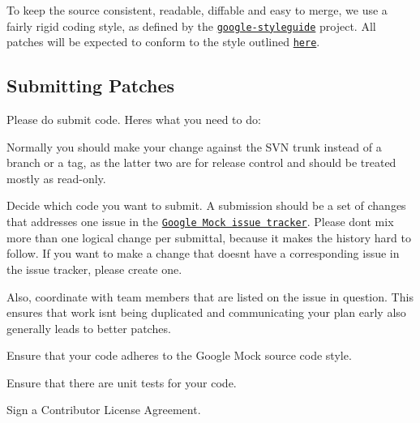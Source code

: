To keep the source consistent, readable, diffable and easy to merge, we use a fairly rigid coding style, as defined by the \href{https://github.com/google/styleguide}{\tt google-\/styleguide} project. All patches will be expected to conform to the style outlined \href{https://github.com/google/styleguide/blob/gh-pages/cppguide.xml}{\tt here}.

\subsection*{Submitting Patches}

Please do submit code. Here\textquotesingle{}s what you need to do\+:


\begin{DoxyEnumerate}
\item Normally you should make your change against the S\+VN trunk instead of a branch or a tag, as the latter two are for release control and should be treated mostly as read-\/only.
\end{DoxyEnumerate}
\begin{DoxyEnumerate}
\item Decide which code you want to submit. A submission should be a set of changes that addresses one issue in the \href{http://code.google.com/p/googlemock/issues/list}{\tt Google Mock issue tracker}. Please don\textquotesingle{}t mix more than one logical change per submittal, because it makes the history hard to follow. If you want to make a change that doesn\textquotesingle{}t have a corresponding issue in the issue tracker, please create one.
\end{DoxyEnumerate}
\begin{DoxyEnumerate}
\item Also, coordinate with team members that are listed on the issue in question. This ensures that work isn\textquotesingle{}t being duplicated and communicating your plan early also generally leads to better patches.
\end{DoxyEnumerate}
\begin{DoxyEnumerate}
\item Ensure that your code adheres to the Google Mock source code style.
\end{DoxyEnumerate}
\begin{DoxyEnumerate}
\item Ensure that there are unit tests for your code.
\end{DoxyEnumerate}
\begin{DoxyEnumerate}
\item Sign a Contributor License Agreement.
\end{DoxyEnumerate}
